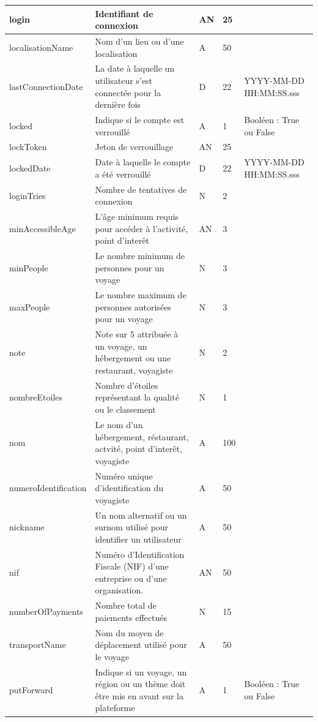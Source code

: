 \documentclass[12pt]{report}
\begin{document}
\begin{longtable}{|p{2cm}|p{4cm}|p{2cm}|p{2cm}|p{4cm}|}
						\hline
						login & Identifiant de connexion & AN & 25&\\	
						\hline
						localisationName & Nom d'un lieu ou d'une localisation & A & 50 &\\
						\hline
						lastConnectionDate & La date à laquelle un utilisateur s'est connectée pour la dernière fois & D & 22 & YYYY-MM-DD HH:MM:SS.sss\\
						\hline
						locked & Indique si le compte est verrouillé & A & 1 & Booléen : True ou False\\
						\hline
						lockToken & Jeton de verrouillage & AN & 25&\\
						\hline
						lockedDate & Date à laquelle le compte a été verrouillé & D & 22 & YYYY-MM-DD HH:MM:SS.sss\\
						\hline
						loginTries & Nombre de tentatives de connexion & N & 2&\\
						\hline
						minAccessibleAge & L'âge minimum requis pour accéder à l'activité, point d'interêt& AN & 3 & \\
						\hline
						minPeople & Le nombre minimum de personnes pour un voyage & N & 3&\\
						\hline
						maxPeople & Le nombre maximum de personnes autorisées pour un voyage & N & 3 & \\
						\hline
						note & Note sur 5 attribuée à un voyage, un hébergement ou une restaurant, voyagiste & N & 2 &\\
						\hline
						nombreEtoiles & Nombre d'étoiles représentant la qualité ou le classement & N & 1 & \\
						\hline
						nom & Le nom d'un hébergement, réstaurant, actvité, point d'interêt, voyagiste & A & 100 &\\
						\hline
						numeroIdentification & Numéro unique d'identification du voyagiste & A & 50 &\\
						\hline
						nickname & Un nom alternatif ou un surnom utilisé pour identifier un utilisateur & A & 50&\\
						\hline
						nif & Numéro d'Identification Fiscale (NIF) d'une entreprise ou d'une organisation.&AN&50&\\
						\hline
						numberOfPayments & Nombre total de paiements effectués & N & 15&\\
						\hline
						transportName & Nom du moyen de déplacement utilisé pour le voyage  & A & 50 & \\
						\hline
						putForward & Indique si un voyage, un région ou un thème doit être mis en avant sur la plateforme& A&1&Booléen : True ou False\\

\end{longtable}
\end{document}
